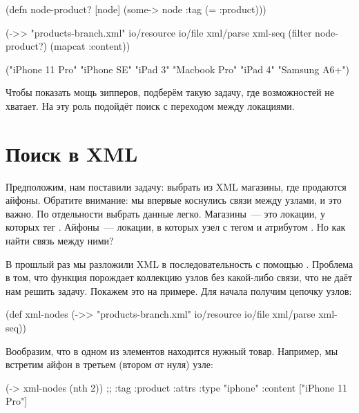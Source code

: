 \begin{english}
  \begin{clojure}
(defn node-product? [node]
  (some-> node :tag (= :product)))

(->> "products-branch.xml"
     io/resource
     io/file
     xml/parse
     xml-seq
     (filter node-product?)
     (mapcat :content))

("iPhone 11 Pro" "iPhone SE" "iPad 3" "Macbook Pro" "iPad 4" "Samsung A6+")
  \end{clojure}
\end{english}

Чтобы показать мощь зипперов, подберём такую задачу, где возможностей 
не хватает. На эту роль подойдёт поиск с переходом между локациями.

\section{Поиск в XML}

Предположим, нам поставили задачу: выбрать из XML магазины, где продаются
айфоны. Обратите внимание: мы впервые коснулись связи между узлами, и это
важно. По отдельности выбрать данные легко. Магазины~--- это локации, у которых
тег . Айфоны~--- локации, в которых узел с тегом  и
атрибутом . Но как найти связь между ними?

В прошлый раз мы разложили XML в последовательность с помощью
. Проблема в том, что функция порождает коллекцию узлов без какой-либо
связи, что не даёт нам решить задачу. Покажем это на примере. Для начала получим
цепочку узлов:

\begin{english}
  \begin{clojure}
(def xml-nodes
  (->> "products-branch.xml"
     io/resource
     io/file
     xml/parse
     xml-seq))
  \end{clojure}
\end{english}

Вообразим, что в одном из элементов находится нужный товар. Например, мы
встретим айфон в третьем (втором от нуля) узле:

\begin{english}
  \begin{clojure}
(-> xml-nodes (nth 2))
;; {:tag :product :attrs {:type "iphone"} :content ["iPhone 11 Pro"]}
  \end{clojure}
\end{english}

